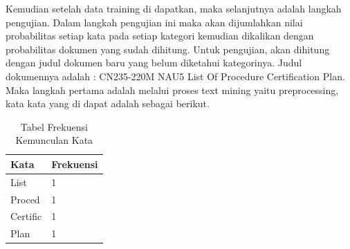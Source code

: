 \par Kemudian setelah data training di dapatkan, maka selanjutnya adalah langkah pengujian. Dalam langkah pengujian ini maka akan dijumlahkan nilai probabilitas setiap kata pada setiap kategori kemudian dikalikan dengan probabilitas dokumen yang sudah dihitung. Untuk pengujian, akan dihitung dengan judul dokumen baru yang belum diketahui kategorinya. Judul dokumennya adalah : CN235-220M NAU5 List Of Procedure Certification Plan. Maka langkah pertama adalah melalui proses text mining yaitu preprocessing, kata kata yang di dapat adalah sebagai berikut.
\begin{table}[!ht]
\centering
\caption{Tabel Frekuensi Kemunculan Kata}
\begin{tabular}{|l|l|}
\hline
Kata     & Frekuensi \\ \hline
List     & 1         \\ \hline
Proced   & 1         \\ \hline
Certific & 1         \\ \hline
Plan     & 1         \\ \hline
\end{tabular}
\end{table}

